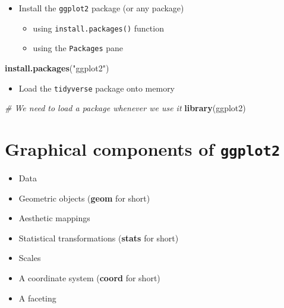 \documentclass[]{book}
\newenvironment{Shaded}{\begin{snugshade}}{\end{snugshade}}
\newcommand{\CommentTok}[1]{\textcolor[rgb]{0.56,0.35,0.01}{\textit{#1}}}
\newcommand{\KeywordTok}[1]{\textcolor[rgb]{0.13,0.29,0.53}{\textbf{#1}}}
\newcommand{\NormalTok}[1]{#1}
\newcommand{\StringTok}[1]{\textcolor[rgb]{0.31,0.60,0.02}{#1}}
\providecommand{\tightlist}{%
  \setlength{\itemsep}{0pt}\setlength{\parskip}{0pt}}
\begin{document}
\begin{itemize}
\tightlist
\item
  Install the \texttt{ggplot2} package (or any package)

  \begin{itemize}
  \tightlist
  \item
    using \texttt{install.packages()} function
  \item
    using the \texttt{Packages} pane
  \end{itemize}
\end{itemize}

\begin{Shaded}
\begin{Highlighting}[]
\KeywordTok{install.packages}\NormalTok{(}\StringTok{"ggplot2"}\NormalTok{)}
\end{Highlighting}
\end{Shaded}

\begin{itemize}
\tightlist
\item
  Load the \texttt{tidyverse} package onto memory
\end{itemize}

\begin{Shaded}
\begin{Highlighting}[]
\CommentTok{# We need to load a package whenever we use it}
\KeywordTok{library}\NormalTok{(ggplot2)}
\end{Highlighting}
\end{Shaded}

\hypertarget{graphical-components-of-ggplot2}{%
\section{\texorpdfstring{Graphical components of \texttt{ggplot2}}{Graphical components of ggplot2}}\label{graphical-components-of-ggplot2}}

\begin{itemize}
\tightlist
\item
  Data
\item
  Geometric objects (\textbf{geom} for short)
\item
  Aesthetic mappings
\item
  Statistical transformations (\textbf{stats} for short)
\item
  Scales
\item
  A coordinate system (\textbf{coord} for short)
\item
  A faceting
\end{itemize}
\end{document}
